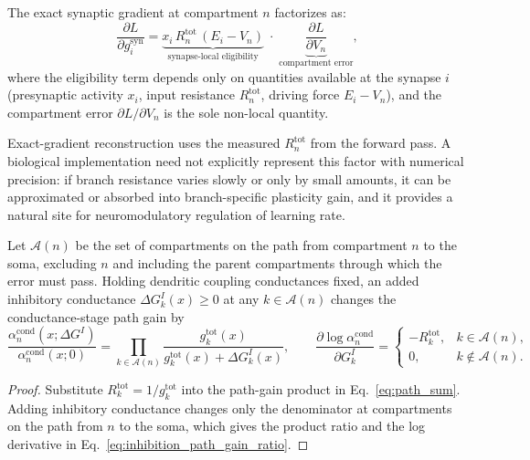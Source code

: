     \begin{corollary}
    \label{cor:factorization}
    The exact synaptic gradient at compartment $n$ factorizes as:
    \begin{equation}
    \frac{\partial L}{\partial g_i^{\mathrm{syn}}} =
    \underbrace{x_i\, R_n^{\mathrm{tot}}\, (E_i - V_n)}_{\text{synapse-local eligibility}} \;\cdot\;
    \underbrace{\frac{\partial L}{\partial V_n}}_{\text{compartment error}},
    \label{eq:factorization}
    \end{equation}
    where the eligibility term depends only on quantities available at the synapse $i$ (presynaptic activity $x_i$, input resistance $R_n^{\mathrm{tot}}$, driving force $E_i - V_n$), and the compartment error $\partial L / \partial V_n$ is the sole non-local quantity.
    \end{corollary}
    Exact-gradient reconstruction uses the measured $R_n^{\mathrm{tot}}$ from the forward pass. A biological implementation need not explicitly represent this factor with numerical precision: if branch resistance varies slowly or only by small amounts, it can be approximated or absorbed into branch-specific plasticity gain, and it provides a natural site for neuromodulatory regulation of learning rate.
    
    \begin{proposition}
    \label{prop:inhibitory_path_gain}
    Let $\mathcal{A}(n)$ be the set of compartments on the path from compartment $n$ to the soma, excluding $n$ and including the parent compartments through which the error must pass. Holding dendritic coupling conductances fixed, an added inhibitory conductance $\Delta G_k^I(x)\geq 0$ at any $k\in\mathcal{A}(n)$ changes the conductance-stage path gain by
    \begin{equation}
    \frac{\alpha_n^{\mathrm{cond}}(x;\Delta G^I)}{\alpha_n^{\mathrm{cond}}(x;0)}
    =
    \prod_{k\in\mathcal{A}(n)}
    \frac{g_k^{\mathrm{tot}}(x)}
    {g_k^{\mathrm{tot}}(x)+\Delta G_k^I(x)} ,
    \qquad
    \frac{\partial \log \alpha_n^{\mathrm{cond}}}{\partial G_k^I} =
    \begin{cases}
    -R_k^{\mathrm{tot}}, & k\in\mathcal{A}(n),\\
    0, & k\notin\mathcal{A}(n).
    \end{cases}
    \label{eq:inhibition_path_gain_ratio}
    \end{equation}
    \end{proposition}
    \begin{proof}
    Substitute $R_k^{\mathrm{tot}}=1/g_k^{\mathrm{tot}}$ into the path-gain product in Eq.~\eqref{eq:path_sum}. Adding inhibitory conductance changes only the denominator at compartments on the path from $n$ to the soma, which gives the product ratio and the log derivative in Eq.~\eqref{eq:inhibition_path_gain_ratio}.
    \end{proof}
    
